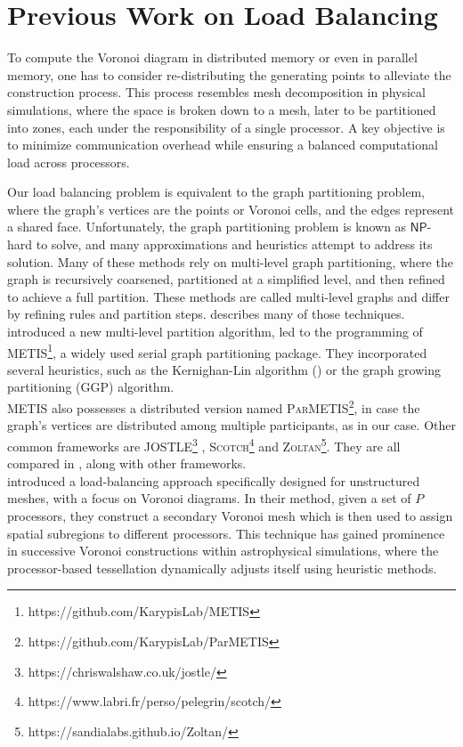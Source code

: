 \section{Previous Work on Load Balancing}
\label{litrature_load}
To compute the Voronoi diagram in distributed memory or even in parallel memory, one has to consider re-distributing the generating points to alleviate the construction process. This process resembles mesh decomposition in physical simulations, where the space is broken down to a mesh, later to be partitioned into zones, each under the responsibility of a single processor. A key objective is to minimize communication overhead while ensuring a balanced computational load across processors.

Our load balancing problem is equivalent to the graph partitioning problem, where the graph's vertices are the points or Voronoi cells, and the edges represent a shared face. Unfortunately, the graph partitioning problem is known as $\mathsf{NP}$-hard to solve, and many approximations and heuristics attempt to address its solution. Many of these methods rely on multi-level graph partitioning, where the graph is recursively coarsened, partitioned at a simplified level, and then refined to achieve a full partition. These methods are called multi-level graphs and differ by refining rules and partition steps. \cite{ChenJie2022Gcfs} describes many of those techniques. \cite{METIS} introduced a new multi-level partition algorithm, led to the programming of \textsc{METIS}\footnote{https://github.com/KarypisLab/METIS}, a widely used serial graph partitioning package. They incorporated several heuristics, such as the Kernighan-Lin algorithm (\cite{KL}) or the graph growing partitioning (GGP) algorithm. \\
\textsc{METIS} also possesses a distributed version named \textsc{ParMETIS}\footnote{https://github.com/KarypisLab/ParMETIS}, in case the graph's vertices are distributed among multiple participants, as in our case.
Other common frameworks are \textsc{JOSTLE}\footnote{https://chriswalshaw.co.uk/jostle/} \cite{JOSTLE}, \textsc{Scotch}\footnote{https://www.labri.fr/perso/pelegrin/scotch/} and \textsc{Zoltan}\footnote{https://sandialabs.github.io/Zoltan/}. They are all compared in \cite{benchmark_graph_frameworks}, along with other frameworks. \\
\cite{Steinberg_2015} introduced a load-balancing approach specifically designed for unstructured meshes, with a focus on Voronoi diagrams. In their method, given a set of $P$ processors, they construct a secondary Voronoi mesh which is then used to assign spatial subregions to different processors. This technique has gained prominence in successive Voronoi constructions within astrophysical simulations, where the processor-based tessellation dynamically adjusts itself using heuristic methods. \\
